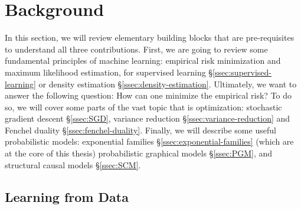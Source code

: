 \chapter{Background}
\label{ch:background}

In this section, we will review elementary building blocks that are pre-requisites to understand all three contributions.
First, we are going to review some fundamental principles of machine learning: empirical risk minimization and maximum likelihood estimation, for supervised learning \S\ref{ssec:supervised-learning} or density estimation \S\ref{ssec:density-estimation}.
Ultimately, we want to answer the following question: How can one minimize the empirical risk?
To do so, we will cover some parts of the vast topic that is optimization: stochastic gradient descent \S\ref{ssec:SGD}, variance reduction \S\ref{ssec:variance-reduction} and Fenchel duality \S\ref{ssec:fenchel-duality}.
Finally, we will describe some useful probabilistic models: exponential families \S\ref{ssec:exponential-families} (which are at the core of this thesis) probabilistic graphical models \S\ref{ssec:PGM}, and  structural causal models \S\ref{ssec:SCM}.



\section{Learning from Data}

